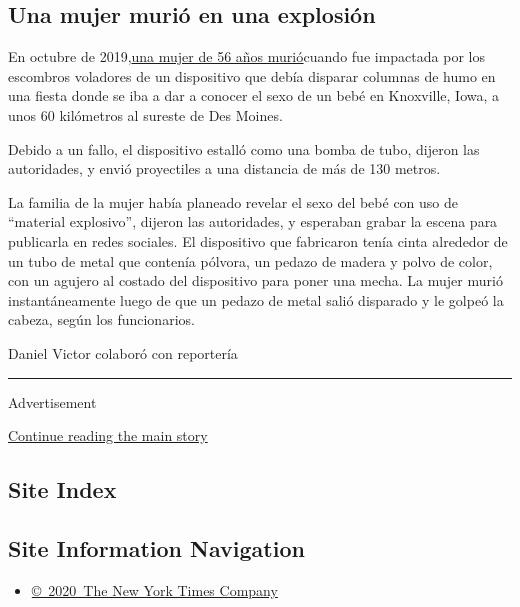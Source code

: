 \hypertarget{una-mujer-muriuxf3-en-una-explosiuxf3n}{%
\subsection{Una mujer murió en una
explosión}\label{una-mujer-muriuxf3-en-una-explosiuxf3n}}

En octubre de
2019,\href{https://www.nytimes3xbfgragh.onion/2019/10/28/us/gender-reveal-party-death.html}{una
mujer de 56 años murió}cuando fue impactada por los escombros voladores
de un dispositivo que debía disparar columnas de humo en una fiesta
donde se iba a dar a conocer el sexo de un bebé en Knoxville, Iowa, a
unos 60 kilómetros al sureste de Des Moines.

Debido a un fallo, el dispositivo estalló como una bomba de tubo,
dijeron las autoridades, y envió proyectiles a una distancia de más de
130 metros.

La familia de la mujer había planeado revelar el sexo del bebé con uso
de ``material explosivo'', dijeron las autoridades, y esperaban grabar
la escena para publicarla en redes sociales. El dispositivo que
fabricaron tenía cinta alrededor de un tubo de metal que contenía
pólvora, un pedazo de madera y polvo de color, con un agujero al costado
del dispositivo para poner una mecha. La mujer murió instantáneamente
luego de que un pedazo de metal salió disparado y le golpeó la cabeza,
según los funcionarios.

Daniel Victor colaboró con reportería

\begin{center}\rule{0.5\linewidth}{\linethickness}\end{center}

Advertisement

\protect\hyperlink{after-bottom}{Continue reading the main story}

\hypertarget{site-index}{%
\subsection{Site Index}\label{site-index}}

\hypertarget{site-information-navigation}{%
\subsection{Site Information
Navigation}\label{site-information-navigation}}

\begin{itemize}
\tightlist
\item
  \href{https://help.nytimes3xbfgragh.onion/hc/en-us/articles/115014792127-Copyright-notice}{©~2020~The
  New York Times Company}
\end{itemize}

